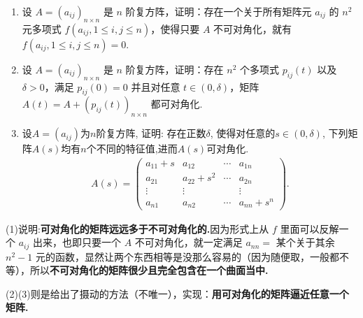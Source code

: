 \documentclass[../../main.tex]{subfiles}
\begin{document}
\begin{proposition}[不可对角化矩阵的摄动]\label{proposition:不可对角化矩阵的摄动}
\begin{enumerate}[(1)]
\item 设 $A = (a_{ij})_{n\times n}$ 是 $n$ 阶复方阵，证明：存在一个关于所有矩阵元 $a_{ij}$ 的 $n^2$ 元多项式 $f(a_{ij}, 1\leq i, j\leq n)$，使得只要 $A$ 不可对角化，就有 $f(a_{ij}, 1\leq i, j\leq n)=0$.

\item 设 $A = (a_{ij})_{n\times n}$ 是 $n$ 阶复方阵，证明：存在 $n^2$ 个多项式 $p_{ij}(t)$ 以及 $\delta > 0$，满足 $p_{ij}(0)=0$ 并且对任意 $t\in(0, \delta)$，矩阵 $A(t)=A + (p_{ij}(t))_{n\times n}$ 都可对角化. 

\item 设\(A = (a_{ij})\)为\(n\)阶复方阵, 证明: 存在正数\(\delta\), 使得对任意的\(s \in (0,\delta)\), 下列矩阵$A(s)$均有\(n\)个不同的特征值,进而$A(s)$可对角化.
\begin{align*}
A(s)= 
\begin{pmatrix}
a_{11}+s & a_{12} & \cdots & a_{1n}\\
a_{21} & a_{22}+s^{2} & \cdots & a_{2n}\\
\vdots & \vdots & & \vdots\\
a_{n1} & a_{n2} & \cdots & a_{nn}+s^{n}
\end{pmatrix}.
\end{align*}
\end{enumerate}
\end{proposition}
\begin{remark}
(1)说明:\textbf{可对角化的矩阵远远多于不可对角化的.}因为形式上从 $f$ 里面可以反解一个 $a_{ij}$ 出来，也即只要一个 $A$ 不可对角化，就一定满足 $a_{nn} =$ 某个关于其余 $n^2 - 1$ 元的函数，显然让两个东西相等是没那么容易的（因为随便取，一般都不等），所以\textbf{不可对角化的矩阵很少且完全包含在一个曲面当中.}

(2)(3)则是给出了摄动的方法（不唯一），实现：\textbf{用可对角化的矩阵逼近任意一个矩阵.} 
\end{remark}
\end{document}
